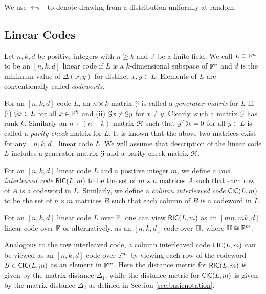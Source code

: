 We use $\sample$ to denote drawing from a distribution uniformly at random.


\subsection{Linear Codes}
\begin{definition}\label{defn:lincode}
	Let $n,k,d$ be positive integers with $n\geq k$ and $\FF$ be a finite field. We
	call $L\subseteq \FF^n$ to be an $[n,k,d]$ linear code if $L$ is a $k$-dimensional
	subspace of $\FF^n$ and $d$ is the minimum value of $\Delta(x,y)$ for distinct
	$x,y\in L$. Elements of $L$ are conventionally called {\em codewords}.
\end{definition}

For an $[n,k,d]$ code $L$, an $n\times k$ matrix $\calG$ is called a {\em
	generator matrix} for $L$ iff (i) $\calG x\in L$ for all $x \in \bbF^k$ and (ii)
$\calG x\neq \calG y$ for $x\neq y$. Clearly, such a matrix $\calG$ has rank
$k$. Similarly an $n\times (n-k)$ matrix $\calH$ such that $y^T \calH = 0$ for
all $y\in L$ is called a {\em parity check} matrix for $L$. It is known
that the above two matrices exist for any $[n,k,d]$ linear code $L$. We will
assume that description of the linear code $L$ includes a generator matrix
$\calG$ and a parity check matrix $\calH$.

\begin{definition}\label{defn:interleavedcode}
	For an $[n,k,d]$ linear code $L$ and a positive integer $m$, we define a {\em row interleaved code} $\ric{L}{m}$ to be the set of $m\times n$ matrices $A$ such that each row of $A$ is a codeword in $L$. Similarly, we define a {\em column interleaved code} $\cic{L}{m}$ to be the set of $n\times m$ matrices $B$ such that each column of $B$ is a codeword in $L$.
\end{definition}

For  an  $[n,k,d]$ linear code $L$ over $\FF$, one can view $\ric{L}{m}$ as
an $[mn,mk,d]$ linear code over  $\FF$ or alternatively,  as an $[n,k,d]$ code over $\HH$, where $\HH\cong \FF^m$. 

Analogous to the row interleaved code, a column interleaved code $\cic{L}{m}$ 
can be viewed as an $[n,k,d]$ code over $\bbF^m$ by viewing each row of the
codeword $B\in \cic{L}{m}$ as an element in $\bbF^m$. Here the distance metric
for $\ric{L}{m}$ is given by the matrix distance $\Delta_1$, while the distance
metric for $\cic{L}{m}$ is given by the matrix distance $\Delta_2$ as defined in
Section \ref{sec:basicnotation}.  


